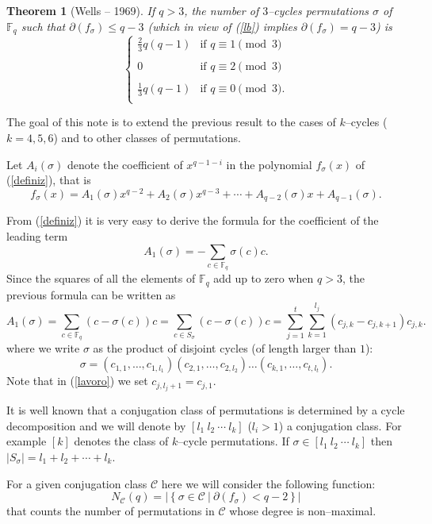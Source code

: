 \documentclass[10pt,a4paper,twoside]{article}
\def\Fq{{\mathbb{F}}_q}
\def\Cl{{\mathcal{C}}}
\newtheorem{theorem}{Theorem}[section]
\begin{document}
\begin{theorem}[Wells -- 1969] If $q>3$,
the number of $3$--cycles permutations $\sigma$ of $\Fq$ such that
$\partial(f_\sigma)\leq q-3$ (which in view of (\ref{lb}) implies
$\partial(f_\sigma)= q-3$) is
$$
\left\{\begin{array}{ll}
\frac{2}{3}q(q-1) & \textrm{if\ } q\equiv1\pmod3\\
\\
0 & \textrm{if\ } q\equiv2\pmod3\\
\\
\frac{1}{3}q(q-1) & \textrm{if\ } q\equiv0\pmod3.\\
\end{array}\right.
$$
\end{theorem}

The goal of this note is to extend the previous result to the cases of $k$--cycles
($k=4,5, 6$) and to other classes of permutations.

Let $A_i(\sigma)$ denote the coefficient of $x^{q-1-i}$ in the polynomial $f_\sigma(x)$
of (\ref{definiz}), that is
$$f_\sigma(x)=A_1(\sigma)x^{q-2}+A_2(\sigma)x^{q-3}+
\cdots+A_{q-2}(\sigma)x+A_{q-1}(\sigma).$$

From (\ref{definiz}) it is very easy to derive the formula for the coefficient
of the leading term
$$A_1(\sigma)=-\sum_{c\in\Fq}\sigma(c)c.$$
Since the squares of all the elements of $\Fq$ add up to zero when $q>3$,
the previous formula can be written as
\begin{equation}\label{lavoro}
A_1(\sigma)=\sum_{c\in\Fq}(c-\sigma(c))c=
\sum_{c\in S_\sigma}(c-\sigma(c))c=\sum_{j=1}^t
\sum_{k=1}^{l_j}(c_{j,k}-c_{j,k+1})c_{j,k}.
\end{equation}
where we write $\sigma$ as the product of disjoint cycles (of length larger than $1$):
$$\sigma=(c_{1,1},\ldots, c_{1,l_1})(c_{2,1},\ldots, c_{2,l_2})
\ldots(c_{k,1},\ldots, c_{t,l_t}).$$
Note that in (\ref{lavoro})
we set $c_{j,l_j+1}=c_{j,1}$.

It is well known that a conjugation class of permutations is determined by a cycle
decomposition and we will denote by $[l_1\ l_2\ \cdots\ l_k]$ ($l_i>1$)
a conjugation class.
For example $[k]$ denotes the class of $k$--cycle permutations.
If $\sigma\in[l_1\ l_2\ \cdots\ l_k]$
then $|S_\sigma|=l_1+l_2+\cdots+l_k$.

For a given conjugation class $\Cl$ here we will consider the following function:
$$N_{\Cl}(q)=\left|\left\{\sigma\in\Cl \ |\
\partial(f_\sigma)< q-2\right\}\right|$$
that counts the number of permutations in  $\Cl$ whose degree is non--maximal.
\end{document}
